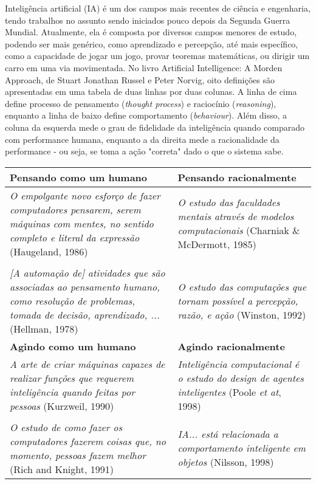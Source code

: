 Inteligência artificial (IA) é um dos campos mais recentes de ciência e engenharia, tendo trabalhos no assunto sendo iniciados pouco depois da Segunda Guerra Mundial. Atualmente, ela é composta por diversos campos menores de estudo, podendo ser mais genérico, como aprendizado e percepção, até mais específico, como a capacidade de jogar um jogo, provar teoremas matemáticas, ou dirigir um carro em uma via movimentada.
No livro Artificial Intelligence: A Morden Approach, de Stuart Jonathan Russel e Peter Norvig, oito definições são apresentadas em uma tabela de duas linhas por duas colunas. A linha de cima define processo de pensamento (\textit{thought process}) e raciocínio (\textit{reasoning}), enquanto a linha de baixo define comportamento (\textit{behaviour}). Além disso, a coluna da esquerda mede o grau de fidelidade da inteligência quando comparado com performance humana, enquanto a da direita mede a racionalidade da performance - ou seja, se toma a ação "correta" dado o que o sistema sabe.

\begin{tabular}{| p{7cm} | p{7cm} |}
  \hline
  \textbf{Pensando como um humano} & \textbf{Pensando racionalmente} \\ \hline
  \textit{O empolgante novo esforço de fazer computadores pensarem, serem máquinas com mentes, no sentido completo e literal da expressão} \newline (Haugeland, 1986) & \textit{O estudo das faculdades mentais através de modelos computacionais} \newline (Charniak \& McDermott, 1985) \\ & \\ \textit{[A automação de] atividades que são associadas ao pensamento humano, como resolução de problemas, tomada de decisão, aprendizado, ...} \newline (Hellman, 1978) & \textit{O estudo das computações que tornam possível a percepção, razão, e ação} \newline (Winston, 1992) \\ \hline
  \textbf{Agindo como um humano} & \textbf{Agindo racionalmente} \\ \hline
  \textit{A arte de criar máquinas capazes de realizar funções que requerem inteligência quando feitas por pessoas} \newline (Kurzweil, 1990) & \textit{Inteligência computacional é o estudo do design de agentes inteligentes} \newline (Poole \textit{et at}, 1998) \\ & \\ \textit{O estudo de como fazer os computadores fazerem coisas que, no momento, pessoas fazem melhor} \newline (Rich and Knight, 1991) & \textit{IA... está relacionada a comportamento inteligente em objetos} \newline (Nilsson, 1998) \\ \hline
\end{tabular}


